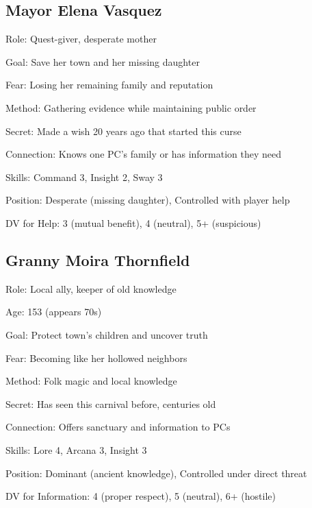 \documentclass[11pt]{article}
\newenvironment{npc}[1]{\begin{description}[leftmargin=*,style=standard]\item[\textbf{#1}]}{\end{description}}
\begin{document}
\subsection{Mayor Elena Vasquez}
\begin{npc}{Mayor Elena Vasquez}
\item[Role:] Quest-giver, desperate mother
\item[Goal:] Save her town and her missing daughter
\item[Fear:] Losing her remaining family and reputation
\item[Method:] Gathering evidence while maintaining public order
\item[Secret:] Made a wish 20 years ago that started this curse
\item[Connection:] Knows one PC's family or has information they need
\item[Skills:] Command 3, Insight 2, Sway 3
\item[Position:] Desperate (missing daughter), Controlled with player help
\item[DV for Help:] 3 (mutual benefit), 4 (neutral), 5+ (suspicious)
\end{npc}

\subsection{Granny Moira Thornfield}
\begin{npc}{Granny Moira Thornfield}
\item[Role:] Local ally, keeper of old knowledge
\item[Age:] 153 (appears 70s)
\item[Goal:] Protect town's children and uncover truth
\item[Fear:] Becoming like her hollowed neighbors
\item[Method:] Folk magic and local knowledge
\item[Secret:] Has seen this carnival before, centuries old
\item[Connection:] Offers sanctuary and information to PCs
\item[Skills:] Lore 4, Arcana 3, Insight 3
\item[Position:] Dominant (ancient knowledge), Controlled under direct threat
\item[DV for Information:] 4 (proper respect), 5 (neutral), 6+ (hostile)
\end{npc}
\end{document}
